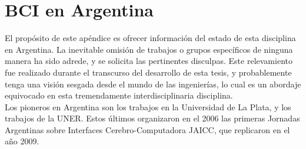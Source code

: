 \chapter{BCI en Argentina}
\label{chapter:ten}

El propósito de este apéndice es ofrecer información del estado de esta disciplina en Argentina.  La inevitable omisión de trabajos o grupos específicos de ninguna manera ha sido adrede, y se solicita las pertinentes disculpas.  Este relevamiento fue realizado durante el transcurso del desarrollo de esta tesis, y probablemente tenga una visión sesgada desde el mundo de las ingenierías, lo cual es un abordaje equivocado en esta tremendamente interdisciplinaria disciplina. \\

Los pioneros en Argentina son los trabajos en la Universidad de La Plata, y los trabajos de la UNER.  Estos últimos organizaron en el 2006 las primeras Jornadas Argentinas sobre Interfaces Cerebro-Computadora JAICC, que replicaron en el año 2009. \\

